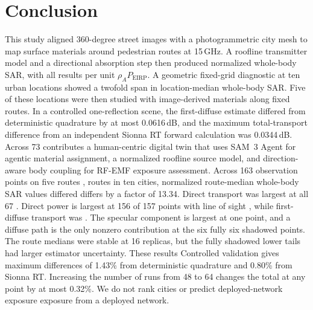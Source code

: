 \documentclass{IEEEoj} %
\providecommand{\DIFadd}[1]{{\protect\color{blue} \sf #1}} %
\providecommand{\DIFdel}[1]{{\protect\color{red} \scriptsize #1}} %
\providecommand{\DIFaddbegin}{} %
\providecommand{\DIFaddend}{} %
\providecommand{\DIFdelbegin}{} %
\providecommand{\DIFdelend}{} %
\begin{document}
\section{Conclusion}\label{sec:conclusion}

This study \DIFdelbegin \DIFdel{aligned 360-degree street images with a photogrammetric city mesh to
map surface materials around pedestrian routes at 15\,GHz. A roofline
transmitter model and a directional absorption step then produced normalized
whole-body SAR, with all results per unit $\rho_A P_{\mathrm{EIRP}}$. A
geometric fixed-grid diagnostic at ten urban locations showed a twofold span in
location-median whole-body SAR. Five of these locations were then studied with
image-derived materials along fixed routes. In a controlled one-reflection
scene, the first-diffuse estimate differed from deterministic quadrature by at
most 0.0616\,dB, and
the maximum total-transport difference from an independent
Sionna RT forward calculation was 0.0344\,dB.
Across 73 }\DIFdelend \DIFaddbegin \DIFadd{contributes a human-centric digital twin that uses SAM~3 Agent for
agentic material assignment, a normalized roofline source model, and
direction-aware body coupling for RF-EMF exposure assessment.
Across 163 }\DIFaddend observation points on \DIFdelbegin \DIFdel{five routes , }\DIFdelend \DIFaddbegin \DIFadd{routes in ten cities, normalized }\DIFaddend route-median
whole-body SAR \DIFdelbegin \DIFdel{values differed }\DIFdelend \DIFaddbegin \DIFadd{differs }\DIFaddend by a factor of \DIFdelbegin \DIFdel{13.34. Direct transport was largest at all 67 }\DIFdelend \DIFaddbegin \DIFadd{14.31. Direct power is largest at 156 of
157 }\DIFaddend points with line of sight\DIFdelbegin \DIFdel{, while
first-diffuse transport was }\DIFdelend \DIFaddbegin \DIFadd{. The specular component is largest at one point, and a
diffuse path is }\DIFaddend the only nonzero contribution at \DIFdelbegin \DIFdel{the six fully
}\DIFdelend \DIFaddbegin \DIFadd{six }\DIFaddend shadowed points. \DIFdelbegin \DIFdel{The route medians were stable at 16 replicas, but the fully
shadowed lower tails had larger estimator uncertainty. These results }\DIFdelend \DIFaddbegin \DIFadd{Controlled
validation gives maximum differences of 1.43\% from deterministic quadrature
and 0.80\% from Sionna RT. Increasing the number of runs from 48 to 64 changes
the total at any point by at most 0.32\%. We }\DIFaddend do not rank cities or predict
\DIFdelbegin \DIFdel{deployed-network exposure }\DIFdelend \DIFaddbegin \DIFadd{exposure from a deployed network}\DIFaddend .
\end{document}
